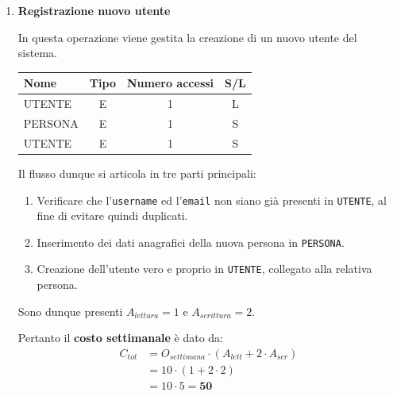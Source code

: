 \documentclass[a4paper,12pt]{report}
\begin{document}
\begin{enumerate}
	\item {\large \textbf{Registrazione nuovo utente}} \label{op1}

	      In questa operazione viene gestita la creazione di un nuovo utente del sistema.

	      \begin{table}[H]
		      \centering
		      \small
		      \renewcommand{\arraystretch}{1.15}
		      \begin{tabularx}{0.8\textwidth}{|X|c|c|c|}
			      \hline
			      \rowcolor{gray!20}
			      \textbf{Nome} & \textbf{Tipo} & \textbf{Numero accessi} & \textbf{S/L} \\
			      \hline
			      UTENTE        & E             & 1                       & L            \\
			      \hline
			      PERSONA       & E             & 1                       & S            \\
			      \hline
			      UTENTE        & E             & 1                       & S            \\
			      \hline
		      \end{tabularx}
	      \end{table}

	      Il flusso dunque si articola in tre parti principali:
	      \begin{enumerate}
		      \item Verificare che l'\texttt{username} ed l'\texttt{email} non siano già presenti in \texttt{UTENTE}, al fine di evitare quindi duplicati.
		      \item Inserimento dei dati anagrafici della nuova persona in \texttt{PERSONA}.
		      \item Creazione dell'utente vero e proprio in \texttt{UTENTE}, collegato alla relativa persona.
	      \end{enumerate}

	      Sono dunque presenti $A_{lettura}=1$ e $A_{scrittura}=2$.

	      Pertanto il \textbf{costo settimanale} è dato da:
	      \begin{align*}
		      C_{tot} & = O_{settimana} \cdot (A_{lett} + 2 \cdot A_{scr}) \\
		              & = 10 \cdot (1 + 2 \cdot 2)                         \\
		              & = 10 \cdot 5 = \mathbf{50}
	      \end{align*}



\end{enumerate}
\end{document}
